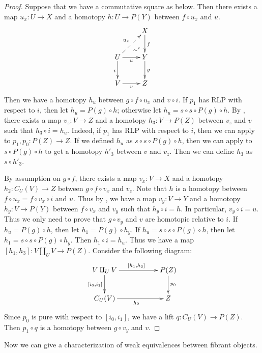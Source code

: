 \documentclass[reqno]{amsart}
\theoremstyle{definition}
\newcommand{\cyli}{i}
\begin{document}
\begin{proof}
Suppose that we have a commutative square as below.
Then there exists a map $u_x : U \to X$ and a homotopy $h : U \to P(Y)$ between $f \circ u_x$ and $u$.
\[ \xymatrix{   \ar@{}[dr]|(.7){\sim^r}               & X \ar[d]^f \\
              U \ar@{-->}[ur]^{u_x} \ar[d]_i \ar[r]_u & Y \ar[d]^g \\
              V \ar[r]_v                              & Z
            } \]
Then we have a homotopy $h_u$ between $g \circ f \circ u_x$ and $v \circ i$.
If $p_1$ has RLP with respect to $i$, then let $h_u = P(g) \circ h$; otherwise let $h_u = s \circ s \circ P(g) \circ h$.
By , there exists a map $v_z : V \to Z$ and a homotopy $h_3 : V \to P(Z)$ between $v_z$ and $v$ such that $h_3 \circ i = h_u$.
Indeed, if $p_1$ has RLP with respect to $i$, then we can apply  to $p_1,p_0 : P(Z) \to Z$.
If we defined $h_u$ as $s \circ s \circ P(g) \circ h$, then we can apply  to $s \circ P(g) \circ h$ to get a homotopy $h'_3$ between $v$ and $v_z$.
Then we can define $h_3$ as $s \circ h'_3$.

By assumption on $g \circ f$, there exists a map $v_x : V \to X$ and a homotopy $h_2 : C_U(V) \to Z$ between $g \circ f \circ v_x$ and $v_z$.
Note that $h$ is a homotopy between $f \circ u_x = f \circ v_x \circ i$ and $u$.
Thus by , we have a map $v_y : V \to Y$ and a homotopy $h_y : V \to P(Y)$ between $f \circ v_x$ and $v_y$ such that $h_y \circ i = h$.
In particular, $v_y \circ i = u$.
Thus we only need to prove that $g \circ v_y$ and $v$ are homotopic relative to $i$.
If $h_u = P(g) \circ h$, then let $h_1 = P(g) \circ h_y$.
If $h_u = s \circ s \circ P(g) \circ h$, then let $h_1 = s \circ s \circ P(g) \circ h_y$.
Then $h_1 \circ i = h_u$.
Thus we have a map $[h_1,h_3] : V \amalg_U V \to P(Z)$.
Consider the following diagram:
\[ \xymatrix{ V \amalg_U V \ar[rr]^{[h_1, h_3]} \ar[d]_{[\cyli_0,\cyli_1]} & & P(Z) \ar[d]^{p_0} \\
              C_U(V) \ar[rr]_{h_2} & & Z
            } \]
Since $p_0$ is pure with respect to $[\cyli_0,\cyli_1]$, we have a lift $q : C_U(V) \to P(Z)$.
Then $p_1 \circ q$ is a homotopy between $g \circ v_y$ and $v$.
\end{proof}

Now we can give a characterization of weak equivalences between fibrant objects.
\end{document}
